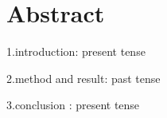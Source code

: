 \chapter{Abstract}
\label{ch:abstract}
1.introduction: present tense \par\noindent
2.method and result: past tense	\par\noindent
3.conclusion : present tense 